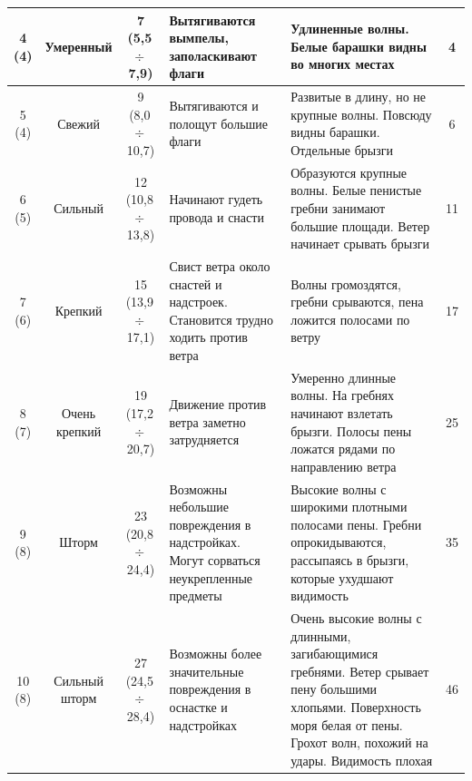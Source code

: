 \documentclass[a4paper, 12pt, twoside, final, book, russian, fittopage, cyremdash]{ncc}
\newcommand{\otdo}{\,\ensuremath{\div}\,}
\begin{document}
\begin{longtable}{c|c|c|p{}|p{}|c}
  \midrule
  \shortstack{4\\(4)} & Умеренный & \shortstack{7\\(5,5\otdo 7,9)} & Вытягиваются вымпелы, заполаскивают флаги & Удлиненные волны. Белые барашки видны во многих местах & 4 \\
  \midrule
  \shortstack{5\\(4)} & Свежий & \shortstack{9\\(8,0\otdo 10,7)} & Вытягиваются и полощут большие флаги & Развитые в длину, но не крупные волны. Повсюду видны барашки. Отдельные брызги & 6 \\
  \midrule
  \shortstack{6\\(5)} & Сильный & \shortstack{12\\(10,8\otdo 13,8)} & Начинают гудеть провода и снасти & Образуются крупные волны. Белые пенистые гребни занимают большие площади. Ветер начинает срывать брызги & 11 \\
  \midrule
  \shortstack{7\\(6)} & Крепкий & \shortstack{15\\(13,9\otdo 17,1)} & Свист ветра около снастей и надстроек. Становится трудно ходить против ветра & Волны громоздятся, гребни срываются, пена ложится полосами по ветру & 17 \\
  \midrule
  \shortstack{8\\(7)} & \shortstack{Очень\\крепкий} & \shortstack{19\\(17,2\otdo 20,7)} & Движение против ветра заметно затрудняется & Умеренно длинные волны. На гребнях начинают взлетать брызги. Полосы пены ложатся рядами по направлению ветра & 25 \\
  \midrule
  \shortstack{9\\(8)} & Шторм & \shortstack{23\\(20,8\otdo 24,4)} & Возможны небольшие повреждения в надстройках. Могут сорваться неукрепленные предметы & Высокие волны с широкими плотными полосами пены. Гребни опрокидываются, рассыпаясь в брызги, которые ухудшают видимость & 35 \\
  \midrule
  \shortstack{10\\(8)} & \shortstack{Сильный\\шторм} & \shortstack{27\\(24,5\otdo 28,4)} & Возможны более значительные повреждения в оснастке и надстройках & Очень высокие волны с длинными, загибающимися гребнями. Ветер срывает пену большими хлопьями. Поверхность моря белая от пены. Грохот волн, похожий на удары. Видимость плохая & 46 \\

\end{longtable}
\end{document}
